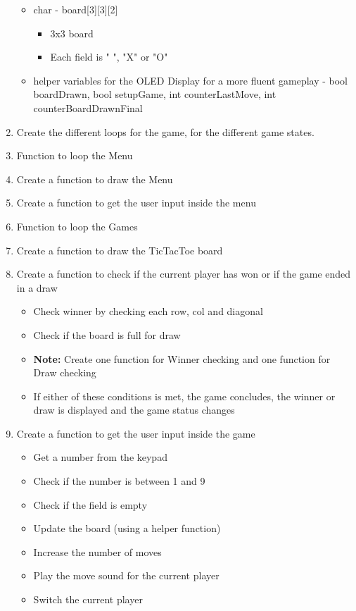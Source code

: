 \documentclass[10pt, oneside]{article}
\theoremstyle{remark}
\begin{document}
\begin{enumerate}
\begin{itemize}
    \item char - board[3][3][2] 
    \begin{itemize}
      \item 3x3 board 
      \item Each field is " ", "X" or "O"
    \end{itemize}
    \item helper variables for the OLED Display for a more fluent gameplay - bool boardDrawn, bool setupGame, int counterLastMove, int counterBoardDrawnFinal
  \end{itemize}
  \item Create the different loops for the game, for the different game states.
  \item Function to loop the Menu
  \item Create a function to draw the Menu
  \item Create a function to get the user input inside the menu
  \item Function to loop the Games
  \item Create a function to draw the TicTacToe board
  \item Create a function to check if the current player has won or if the game ended in a draw
  \begin{itemize}
    \item Check winner by checking each row, col and diagonal
    \item Check if the board is full for draw
    \item \textbf{Note:} Create one function for Winner checking and one function for Draw checking
    \item If either of these conditions is met, the game concludes, the winner or draw is displayed and the game status changes
  \end{itemize}
  \item Create a function to get the user input inside the game
  \begin{itemize}
    \item Get a number from the keypad
    \item Check if the number is between 1 and 9
    \item Check if the field is empty
    \item Update the board (using a helper function)
    \item Increase the number of moves
    \item Play the move sound for the current player
    \item Switch the current player

\end{itemize}
\end{enumerate}
\end{document}
